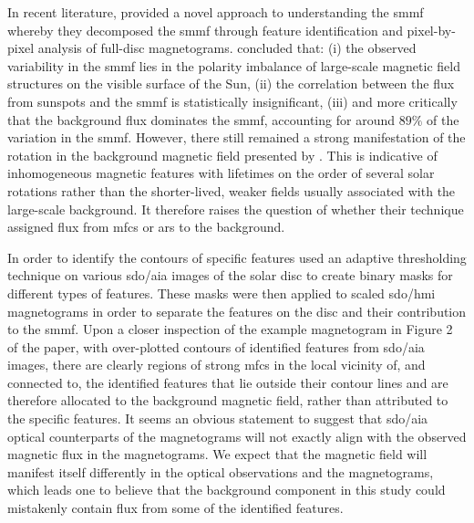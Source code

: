 In recent literature, \citet{bose_variability_2018} provided a novel approach to understanding the \gls{smmf} whereby they decomposed the \gls{smmf} through feature identification and pixel-by-pixel analysis of full-disc magnetograms. \citet{bose_variability_2018} concluded that: (i) the observed variability in the \gls{smmf} lies in the polarity imbalance of large-scale magnetic field structures on the visible surface of the Sun, (ii) the correlation between the flux from sunspots and the \gls{smmf} is statistically insignificant, (iii) and more critically that the background flux dominates the \gls{smmf}, accounting for around $89 \%$ of the variation in the \gls{smmf}. However, there still remained a strong manifestation of the rotation in the background magnetic field presented by \citet{bose_variability_2018}. This is indicative of inhomogeneous magnetic features with lifetimes on the order of several solar rotations rather than the shorter-lived, weaker fields usually associated with the large-scale background. It therefore raises the question of whether their technique assigned flux from \glspl{mfc} or \glspl{ar} to the background.

In order to identify the contours of specific features \citet{bose_variability_2018} used an adaptive thresholding technique on various \gls{sdo/aia} images of the solar disc to create binary masks for different types of features. These masks were then applied to scaled \gls{sdo/hmi} magnetograms in order to separate the features on the disc and their contribution to the \gls{smmf}. Upon a closer inspection of the example magnetogram in Figure 2 of the paper, with over-plotted contours of identified features from \gls{sdo/aia} images, there are clearly regions of strong \glspl{mfc} in the local vicinity of, and connected to, the identified features that lie outside their contour lines and are therefore allocated to the background magnetic field, rather than attributed to the specific features. It seems an obvious statement to suggest that \gls{sdo/aia} optical counterparts of the magnetograms will not exactly align with the observed magnetic flux in the magnetograms. We expect that the magnetic field will manifest itself differently in the optical observations and the magnetograms, which leads one to believe that the background component in this study could mistakenly contain flux from some of the identified features.

